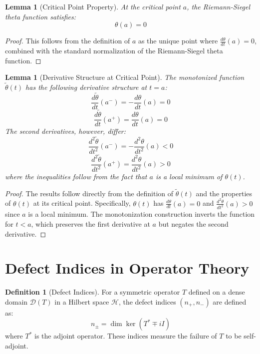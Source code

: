 \documentclass{article}
\newtheorem{lemma}[theorem]{Lemma}
\theoremstyle{definition}
\newtheorem{definition}[theorem]{Definition}
\begin{document}
\begin{lemma}[Critical Point Property]
At the critical point $a$, the Riemann-Siegel theta function satisfies:
\begin{equation}
\theta(a) = 0
\end{equation}
\end{lemma}

\begin{proof}
This follows from the definition of $a$ as the unique point where $\frac{d\theta}{dt}(a) = 0$, combined with the standard normalization of the Riemann-Siegel theta function.
\end{proof}

\begin{lemma}[Derivative Structure at Critical Point]
The monotonized function $\tilde{\theta}(t)$ has the following derivative structure at $t = a$:
\begin{equation}
\frac{d\tilde{\theta}}{dt}(a^-) = -\frac{d\theta}{dt}(a) = 0
\end{equation}
\begin{equation}
\frac{d\tilde{\theta}}{dt}(a^+) = \frac{d\theta}{dt}(a) = 0
\end{equation}
The second derivatives, however, differ:
\begin{equation}
\frac{d^2\tilde{\theta}}{dt^2}(a^-) = -\frac{d^2\theta}{dt^2}(a) < 0
\end{equation}
\begin{equation}
\frac{d^2\tilde{\theta}}{dt^2}(a^+) = \frac{d^2\theta}{dt^2}(a) > 0
\end{equation}
where the inequalities follow from the fact that $a$ is a local minimum of $\theta(t)$.
\end{lemma}

\begin{proof}
The results follow directly from the definition of $\tilde{\theta}(t)$ and the properties of $\theta(t)$ at its critical point. Specifically, $\theta(t)$ has $\frac{d\theta}{dt}(a) = 0$ and $\frac{d^2\theta}{dt^2}(a) > 0$ since $a$ is a local minimum. The monotonization construction inverts the function for $t < a$, which preserves the first derivative at $a$ but negates the second derivative.
\end{proof}

\section{Defect Indices in Operator Theory}

\begin{definition}[Defect Indices]
For a symmetric operator $T$ defined on a dense domain $\mathcal{D}(T)$ in a Hilbert space $\mathcal{H}$, the defect indices $(n_+, n_-)$ are defined as:
\begin{equation}
n_{\pm} = \dim\ker(T^* \mp iI)
\end{equation}
where $T^*$ is the adjoint operator. These indices measure the failure of $T$ to be self-adjoint.
\end{definition}
\end{document}
